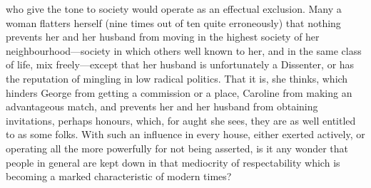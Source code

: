\documentclass[12pt]{report}
\begin{document}
who give the tone to society would operate as an effectual exclusion. Many a woman flatters herself (nine times out of ten quite erroneously) that nothing prevents her and her husband from moving in the highest society of her neighbourhood—society in which others well known to her, and in the same class of life, mix freely—except that her husband is unfortunately a Dissenter, or has the reputation of mingling in low radical politics. That it is, she thinks, which hinders George from getting a commission or a place, Caroline from making an advantageous match, and prevents her and her husband from obtaining invitations, perhaps honours, which, for aught she sees, they are as well entitled to as some folks. With such an influence in every house, either exerted actively, or operating all the more powerfully for not being asserted, is it any wonder that people in general are kept down in that mediocrity of respectability which is becoming a marked characteristic of modern times?
\end{document}
